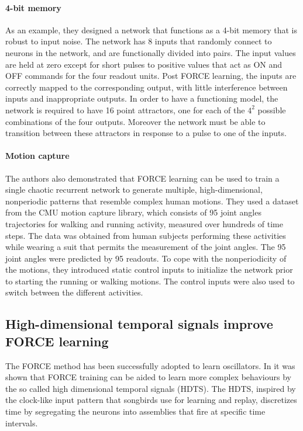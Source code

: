 \documentclass[10pt,a4paper, final]{report} %
\begin{document}
\paragraph{4-bit memory}
As an example, they designed a network that functions as a 4-bit memory that is robust to input noise. The network has 8 inputs that randomly connect to neurons in the network, and are functionally divided into pairs. The input values are held at zero except for short pulses to positive values that act as ON and OFF commands for the four readout units. Post FORCE learning, the inputs are correctly mapped to the corresponding output, with little interference between inputs and inappropriate outputs. In order to have a functioning model, the network is required to have 16 point attractors, one for each of the $4^2$ possible combinations of the four outputs. Moreover the network must be able to transition between these attractors in response to a pulse to one of the inputs.

\paragraph{Motion capture}
The authors  also demonstrated that FORCE learning can be used to train a single chaotic recurrent network to generate multiple, high-dimensional, nonperiodic patterns that resemble complex human motions. They used a dataset from the CMU motion capture library, which consists of 95 joint angles trajectories for walking and running activity, measured over hundreds of time steps. The data was obtained from human subjects performing these activities while wearing a suit that permits the measurement of the joint angles. The 95 joint angles were predicted by 95 readouts. To cope with the nonperiodicity of the motions, they introduced static control inputs to initialize the network prior to starting the running or walking motions. The control inputs were also used to switch between the different activities.

\subsection{High-dimensional temporal signals improve FORCE learning}
The FORCE method has been successfully adopted to learn oscillators. In \cite{nicola2017supervised} it was shown that FORCE training can be aided to learn more complex behaviours by the so called high dimensional temporal signals (HDTS). The HDTS, inspired by the clock-like input pattern that songbirds use for learning and replay, discretizes time by segregating the neurons into assemblies that fire at specific time intervals. 
\end{document}
